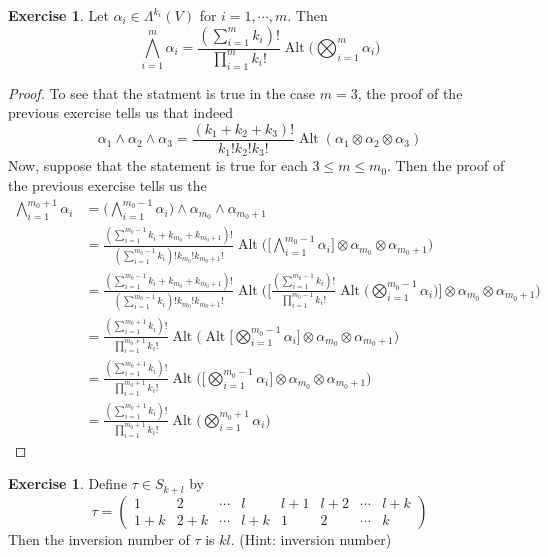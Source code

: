 \documentclass{book}
\theoremstyle{definition}
\newtheorem{ex}[definition]{Exercise}
\newcommand{\al}{\alpha}
\newcommand{\Lam}{\Lambda}
\DeclareMathOperator{\Alt}{Alt}
\DeclareMathOperator*{\0}{\mbf{0}}
\DeclareMathOperator*{\1}{\mbf{1}}
\begin{document}
	\begin{ex}
		Let $\al_i \in \Lam^{k_i}(V)$ for $i =1, \cdots, m$. Then $$\bigwedge_{i=1}^m \al_i = \frac{(\sum_{i=1}^m k_i)!}{\prod_{i=1}^m k_i!} \Alt \bigg(\bigotimes_{i=1}^m \al_i \bigg)$$
	\end{ex}

	\begin{proof}
		To see that the statment is true in the case $m=3$, the proof of the previous exercise tells us that indeed $$\al_1 \wedge \al_2 \wedge \al_3 = \frac{(k_1 + k_2 + k_3)!}{k_1! k_2! k_3!}\Alt(\al_1 \otimes \al_2 \otimes \al_3)$$
		Now, suppose that the statement is true for each $3 \leq m \leq m_0$. Then the proof of the previous exercise tells us the 
		\begin{align*}
			\bigwedge_{i=1}^{m_0 +1} \al_i
			&= \bigg( \bigwedge_{i=1}^{m_0 -1} \al_i \bigg) \wedge \al_{m_0} \wedge \al_{m_0+1} \\
			&= \frac{(\sum_{i=1}^{m_0-1} k_i + k_{m_0} + k_{m_0+1})! }{(\sum_{i=1}^{m_0-1} k_i)! k_{m_0}! k_{m_0+1}!} \Alt \bigg( \bigg[ \bigwedge_{i=1}^{m_0-1} \al_i \bigg] \otimes \al_{m_0} \otimes \al_{m_0 +1}  \bigg) \\
			&= \frac{(\sum_{i=1}^{m_0-1} k_i + k_{m_0} + k_{m_0+1})! }{(\sum_{i=1}^{m_0-1} k_i)! k_{m_0}! k_{m_0+1}!} \Alt \bigg( \bigg[ \frac{(\sum_{i=1}^{m_0-1} k_i)!}{\prod_{i=1}^{m_0-1} k_i!} \Alt \bigg (\bigotimes_{i=1}^{m_0-1} \al_i \bigg) \bigg] \otimes \al_{m_0} \otimes \al_{m_0 +1}  \bigg) \\
			&= \frac{(\sum_{i=1}^{m_0+1} k_i)! }{ \prod_{i=1}^{m_0+1} k_i!}\Alt \bigg( \Alt \bigg [ \bigotimes_{i=1}^{m_0-1} \al_i \bigg] \otimes \al_{m_0} \otimes \al_{m_0 +1}  \bigg) \\
			&= \frac{(\sum_{i=1}^{m_0+1} k_i)! }{ \prod_{i=1}^{m_0+1} k_i!}\Alt \bigg( \bigg [ \bigotimes_{i=1}^{m_0-1} \al_i \bigg] \otimes \al_{m_0} \otimes \al_{m_0 +1}  \bigg) \\
			&= \frac{(\sum_{i=1}^{m_0+1} k_i)! }{ \prod_{i=1}^{m_0+1} k_i!}\Alt \bigg(  \bigotimes_{i=1}^{m_0+1} \al_i   \bigg) 
		\end{align*}
	\end{proof}
	
	\begin{ex}
		Define $\tau \in S_{k+l}$ by 
		\[\tau = 
		\begin{pmatrix}
			1 & 2 & \cdots &l &l+1 & l+2 & \cdots & l+k \\
			1+k & 2+ k & \cdots & l+k & 1 & 2 & \cdots & k 
		\end{pmatrix} 
		\]
		Then the inversion number of $\tau$ is $kl$.
		(Hint: inversion number)
	\end{ex}
\end{document}
